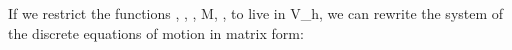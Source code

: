 
\\\\
If we restrict the functions \theta, \nu, \eta, M, ,  to live in V_h, we can rewrite the system of the discrete equations of motion in matrix form:

